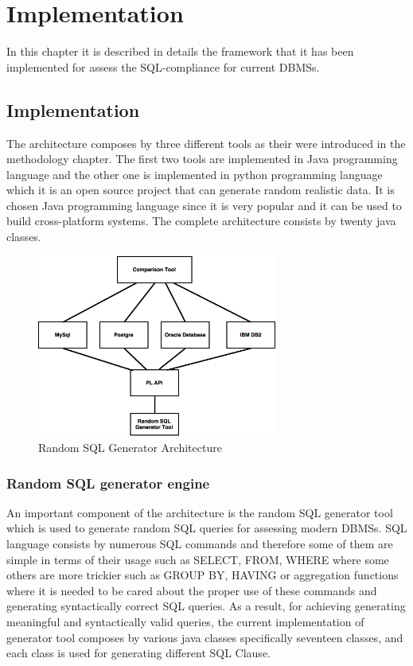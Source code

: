 \chapter{Implementation}
In this chapter it is described in details the framework that it has been implemented for assess the SQL-compliance for current DBMSs.

\section{Implementation}
The architecture composes by three different tools as their were introduced in the methodology chapter. The first two tools are implemented in Java programming language and the other one is implemented in python programming language which it is an open source project that can generate random realistic data.  It is chosen Java programming language since it is very popular and it can be used to build cross-platform systems. The complete architecture consists by twenty java classes. 

 \begin{figure} 
      \centering
      \includegraphics[width=\textwidth,height=6cm]{Images/1-implemen_detail}
      \caption{Random SQL Generator Architecture}
      \label{fig:counting-methods}
  \end{figure}

\subsection{Random SQL generator engine}
An important component of the architecture is the random SQL generator tool which is used to generate random SQL queries for assessing modern DBMSs. SQL language consists by numerous SQL commands and therefore some of them are simple in terms of their usage such as SELECT, FROM, WHERE where some others are more trickier such as GROUP BY, HAVING or aggregation functions where it is needed to be cared about the proper use of these commands and generating syntactically correct SQL queries. As a result, for achieving generating meaningful and syntactically valid queries, the current implementation of generator tool composes by various java classes specifically seventeen classes, and each class is used for generating different SQL Clause. 

